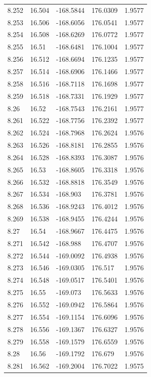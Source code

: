 \begin{tabular}{lllll}
8.252 & 16.504 & -168.5844 & 176.0309 & 1.9577 \\
8.253 & 16.506 & -168.6056 & 176.0541 & 1.9577 \\
8.254 & 16.508 & -168.6269 & 176.0772 & 1.9577 \\
8.255 & 16.51 & -168.6481 & 176.1004 & 1.9577 \\
8.256 & 16.512 & -168.6694 & 176.1235 & 1.9577 \\
8.257 & 16.514 & -168.6906 & 176.1466 & 1.9577 \\
8.258 & 16.516 & -168.7118 & 176.1698 & 1.9577 \\
8.259 & 16.518 & -168.7331 & 176.1929 & 1.9577 \\
8.26 & 16.52 & -168.7543 & 176.2161 & 1.9577 \\
8.261 & 16.522 & -168.7756 & 176.2392 & 1.9577 \\
8.262 & 16.524 & -168.7968 & 176.2624 & 1.9576 \\
8.263 & 16.526 & -168.8181 & 176.2855 & 1.9576 \\
8.264 & 16.528 & -168.8393 & 176.3087 & 1.9576 \\
8.265 & 16.53 & -168.8605 & 176.3318 & 1.9576 \\
8.266 & 16.532 & -168.8818 & 176.3549 & 1.9576 \\
8.267 & 16.534 & -168.903 & 176.3781 & 1.9576 \\
8.268 & 16.536 & -168.9243 & 176.4012 & 1.9576 \\
8.269 & 16.538 & -168.9455 & 176.4244 & 1.9576 \\
8.27 & 16.54 & -168.9667 & 176.4475 & 1.9576 \\
8.271 & 16.542 & -168.988 & 176.4707 & 1.9576 \\
8.272 & 16.544 & -169.0092 & 176.4938 & 1.9576 \\
8.273 & 16.546 & -169.0305 & 176.517 & 1.9576 \\
8.274 & 16.548 & -169.0517 & 176.5401 & 1.9576 \\
8.275 & 16.55 & -169.073 & 176.5633 & 1.9576 \\
8.276 & 16.552 & -169.0942 & 176.5864 & 1.9576 \\
8.277 & 16.554 & -169.1154 & 176.6096 & 1.9576 \\
8.278 & 16.556 & -169.1367 & 176.6327 & 1.9576 \\
8.279 & 16.558 & -169.1579 & 176.6559 & 1.9576 \\
8.28 & 16.56 & -169.1792 & 176.679 & 1.9576 \\
8.281 & 16.562 & -169.2004 & 176.7022 & 1.9575 \\

\end{tabular}
